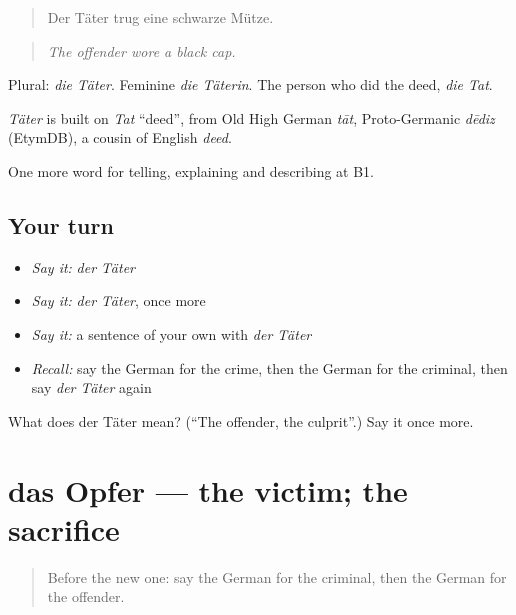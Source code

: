 \begin{quote}
Der Täter trug eine schwarze Mütze.
\end{quote}

\begin{quote}
\emph{The offender wore a black cap.}
\end{quote}

Plural: \emph{die Täter}. Feminine \emph{die Täterin}. The person who did the deed, \emph{die Tat}.

\begin{cousinweb}
\emph{Täter} is built on \emph{Tat} \textquotedblleft{}deed\textquotedblright{}, from Old High German \emph{tāt}, Proto-Germanic \emph{dēdiz} (EtymDB), a cousin of English \emph{deed}.
\end{cousinweb}

\begin{grammarlens}[title={What you've built}]
One more word for telling, explaining and describing at B1.
\end{grammarlens}

\subsection*{Your turn}
\begin{itemize}
\raggedright
  \item \emph{Say it:} \emph{der Täter}
  \item \emph{Say it:} \emph{der Täter}, once more
  \item \emph{Say it:} a sentence of your own with \emph{der Täter}
  \item \emph{Recall:} say the German for the crime, then the German for the criminal, then say \emph{der Täter} again
\end{itemize}

\begin{tcolorbox}[breakable,colback=teal!4,colframe=teal!35!black,title={Before you move on}]
What does der Täter mean? (\textquotedblleft{}The offender, the culprit\textquotedblright{}.) Say it once more.
\end{tcolorbox}
\section[das Opfer]{das Opfer — the victim; the sacrifice}

\label{lesson:GE-C280-opfer}



\begin{quote}
Before the new one: say the German for the criminal, then the German for the offender.
\end{quote}

